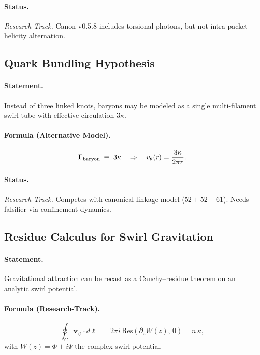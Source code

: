 \documentclass[10pt,reprint,aps,onecolumn,nofootinbib]{revtex4-2}
\begin{document}
\paragraph{Status.} \emph{Research-Track.} Canon v0.5.8 includes torsional photons, but not
    intra-packet helicity alternation.

\subsection{Quark Bundling Hypothesis}
\paragraph{Statement.}
    Instead of three linked knots, baryons may be modeled as a single multi-filament swirl tube
    with effective circulation $3\kappa$.

\paragraph{Formula (Alternative Model).}
    \[
        \Gamma_{\rm baryon} \;\equiv\; 3\kappa
        \quad\Rightarrow\quad
        v_\theta(r) = \frac{3\kappa}{2\pi r}.
    \]

\paragraph{Status.} \emph{Research-Track.} Competes with canonical linkage model
    ($52+52+61$). Needs falsifier via confinement dynamics.

\subsection{Residue Calculus for Swirl Gravitation}
\paragraph{Statement.}
    Gravitational attraction can be recast as a Cauchy–residue theorem on an analytic swirl potential.

\paragraph{Formula (Research-Track).}
    \[
        \oint_C \mathbf{v}_{\!\boldsymbol{\circlearrowleft}} \cdot d\ell
        \;=\; 2\pi i\,\mathrm{Res}\!\left(\partial_z W(z),\,0\right)
        = n\,\kappa,
    \]
    with $W(z)=\Phi+i\Psi$ the complex swirl potential.
\end{document}
